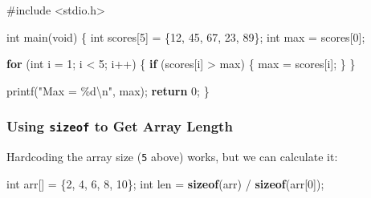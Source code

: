 \documentclass[
  letterpaper,
  DIV=11,
  numbers=noendperiod]{scrreprt}
\newenvironment{Shaded}{\begin{snugshade}}{\end{snugshade}}
\newcommand{\ControlFlowTok}[1]{\textcolor[rgb]{0.00,0.23,0.31}{\textbf{#1}}}
\newcommand{\DataTypeTok}[1]{\textcolor[rgb]{0.68,0.00,0.00}{#1}}
\newcommand{\DecValTok}[1]{\textcolor[rgb]{0.68,0.00,0.00}{#1}}
\newcommand{\ImportTok}[1]{\textcolor[rgb]{0.00,0.46,0.62}{#1}}
\newcommand{\KeywordTok}[1]{\textcolor[rgb]{0.00,0.23,0.31}{\textbf{#1}}}
\newcommand{\NormalTok}[1]{\textcolor[rgb]{0.00,0.23,0.31}{#1}}
\newcommand{\OperatorTok}[1]{\textcolor[rgb]{0.37,0.37,0.37}{#1}}
\newcommand{\PreprocessorTok}[1]{\textcolor[rgb]{0.68,0.00,0.00}{#1}}
\newcommand{\SpecialCharTok}[1]{\textcolor[rgb]{0.37,0.37,0.37}{#1}}
\newcommand{\StringTok}[1]{\textcolor[rgb]{0.13,0.47,0.30}{#1}}
\begin{document}
\begin{Shaded}
\begin{Highlighting}[]
\PreprocessorTok{\#include }\ImportTok{\textless{}stdio.h\textgreater{}}

\DataTypeTok{int}\NormalTok{ main}\OperatorTok{(}\DataTypeTok{void}\OperatorTok{)} \OperatorTok{\{}
    \DataTypeTok{int}\NormalTok{ scores}\OperatorTok{[}\DecValTok{5}\OperatorTok{]} \OperatorTok{=} \OperatorTok{\{}\DecValTok{12}\OperatorTok{,} \DecValTok{45}\OperatorTok{,} \DecValTok{67}\OperatorTok{,} \DecValTok{23}\OperatorTok{,} \DecValTok{89}\OperatorTok{\};}
    \DataTypeTok{int}\NormalTok{ max }\OperatorTok{=}\NormalTok{ scores}\OperatorTok{[}\DecValTok{0}\OperatorTok{];}

    \ControlFlowTok{for} \OperatorTok{(}\DataTypeTok{int}\NormalTok{ i }\OperatorTok{=} \DecValTok{1}\OperatorTok{;}\NormalTok{ i }\OperatorTok{\textless{}} \DecValTok{5}\OperatorTok{;}\NormalTok{ i}\OperatorTok{++)} \OperatorTok{\{}
        \ControlFlowTok{if} \OperatorTok{(}\NormalTok{scores}\OperatorTok{[}\NormalTok{i}\OperatorTok{]} \OperatorTok{\textgreater{}}\NormalTok{ max}\OperatorTok{)} \OperatorTok{\{}
\NormalTok{            max }\OperatorTok{=}\NormalTok{ scores}\OperatorTok{[}\NormalTok{i}\OperatorTok{];}
        \OperatorTok{\}}
    \OperatorTok{\}}

\NormalTok{    printf}\OperatorTok{(}\StringTok{"Max = }\SpecialCharTok{\%d\textbackslash{}n}\StringTok{"}\OperatorTok{,}\NormalTok{ max}\OperatorTok{);}
    \ControlFlowTok{return} \DecValTok{0}\OperatorTok{;}
\OperatorTok{\}}
\end{Highlighting}
\end{Shaded}

\subsubsection{\texorpdfstring{Using \texttt{sizeof} to Get Array
Length}{Using sizeof to Get Array Length}}\label{using-sizeof-to-get-array-length}

Hardcoding the array size (\texttt{5} above) works, but we can calculate
it:

\begin{Shaded}
\begin{Highlighting}[]
\DataTypeTok{int}\NormalTok{ arr}\OperatorTok{[]} \OperatorTok{=} \OperatorTok{\{}\DecValTok{2}\OperatorTok{,} \DecValTok{4}\OperatorTok{,} \DecValTok{6}\OperatorTok{,} \DecValTok{8}\OperatorTok{,} \DecValTok{10}\OperatorTok{\};}
\DataTypeTok{int}\NormalTok{ len }\OperatorTok{=} \KeywordTok{sizeof}\OperatorTok{(}\NormalTok{arr}\OperatorTok{)} \OperatorTok{/} \KeywordTok{sizeof}\OperatorTok{(}\NormalTok{arr}\OperatorTok{[}\DecValTok{0}\OperatorTok{]);}
\end{Highlighting}
\end{Shaded}
\end{document}
